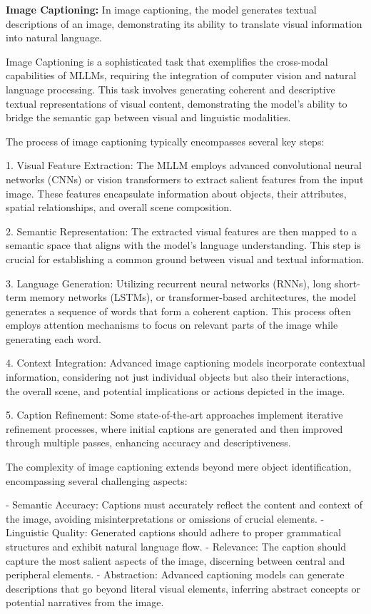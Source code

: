 \textbf{Image Captioning:} In image captioning, the model generates textual descriptions of an image, demonstrating its ability to translate visual information into natural language.

Image Captioning is a sophisticated task that exemplifies the cross-modal capabilities of MLLMs, requiring the integration of computer vision and natural language processing. This task involves generating coherent and descriptive textual representations of visual content, demonstrating the model's ability to bridge the semantic gap between visual and linguistic modalities.

The process of image captioning typically encompasses several key steps:

1. Visual Feature Extraction: The MLLM employs advanced convolutional neural networks (CNNs) or vision transformers to extract salient features from the input image. These features encapsulate information about objects, their attributes, spatial relationships, and overall scene composition.

2. Semantic Representation: The extracted visual features are then mapped to a semantic space that aligns with the model's language understanding. This step is crucial for establishing a common ground between visual and textual information.

3. Language Generation: Utilizing recurrent neural networks (RNNs), long short-term memory networks (LSTMs), or transformer-based architectures, the model generates a sequence of words that form a coherent caption. This process often employs attention mechanisms to focus on relevant parts of the image while generating each word.

4. Context Integration: Advanced image captioning models incorporate contextual information, considering not just individual objects but also their interactions, the overall scene, and potential implications or actions depicted in the image.

5. Caption Refinement: Some state-of-the-art approaches implement iterative refinement processes, where initial captions are generated and then improved through multiple passes, enhancing accuracy and descriptiveness.

The complexity of image captioning extends beyond mere object identification, encompassing several challenging aspects:

- Semantic Accuracy: Captions must accurately reflect the content and context of the image, avoiding misinterpretations or omissions of crucial elements.
- Linguistic Quality: Generated captions should adhere to proper grammatical structures and exhibit natural language flow.
- Relevance: The caption should capture the most salient aspects of the image, discerning between central and peripheral elements.
- Abstraction: Advanced captioning models can generate descriptions that go beyond literal visual elements, inferring abstract concepts or potential narratives from the image.

